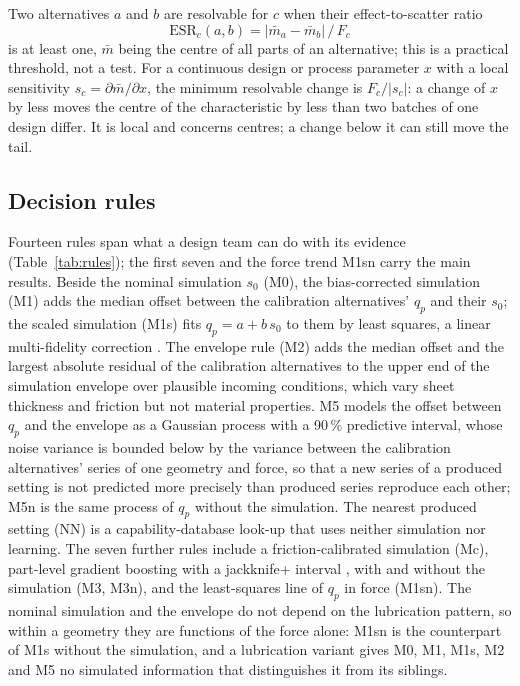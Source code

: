 \documentclass[pdflatex,sn-basic,lineno]{sn-jnl}
\begin{document}
Two alternatives $a$ and $b$ are resolvable for $c$ when their effect-to-scatter ratio
\begin{equation}
\mathrm{ESR}_c(a,b) = |\bar m_a - \bar m_b| \,/\, F_c
\label{eq:esr}
\end{equation}
is at least one, $\bar m$ being the centre of all parts of an alternative; this is a practical threshold, not a test. For a continuous design or process parameter $x$ with a local sensitivity $s_c = \partial \bar m/\partial x$, the minimum resolvable change is $F_c/|s_c|$: a change of $x$ by less moves the centre of the characteristic by less than two batches of one design differ. It is local and concerns centres; a change below it can still move the tail.

\subsection{Decision rules}\label{sec:rules}

Fourteen rules span what a design team can do with its evidence (Table~\ref{tab:rules}); the first seven and the force trend M1sn carry the main results. Beside the nominal simulation $s_0$ (M0), the bias-corrected simulation (M1) adds the median offset between the calibration alternatives' $q_p$ and their $s_0$; the scaled simulation (M1s) fits $q_p = a + b\,s_0$ to them by least squares, a linear multi-fidelity correction \citep{kennedy2000predicting}. The envelope rule (M2) adds the median offset and the largest absolute residual of the calibration alternatives to the upper end of the simulation envelope over plausible incoming conditions, which vary sheet thickness and friction but not material properties. M5 models the offset between $q_p$ and the envelope as a Gaussian process \citep{rasmussen2006gaussian} with a 90\,\% predictive interval, whose noise variance is bounded below by the variance between the calibration alternatives' series of one geometry and force, so that a new series of a produced setting is not predicted more precisely than produced series reproduce each other; M5n is the same process of $q_p$ without the simulation. The nearest produced setting (NN) is a capability-database look-up that uses neither simulation nor learning. The seven further rules include a friction-calibrated simulation \citep{kennedy2001bayesian} (Mc), part-level gradient boosting \citep{friedman2001greedy} with a jackknife+ interval \citep{barber2021predictive}, with and without the simulation (M3, M3n), and the least-squares line of $q_p$ in force (M1sn). The nominal simulation and the envelope do not depend on the lubrication pattern, so within a geometry they are functions of the force alone: M1sn is the counterpart of M1s without the simulation, and a lubrication variant gives M0, M1, M1s, M2 and M5 no simulated information that distinguishes it from its siblings.
\end{document}
